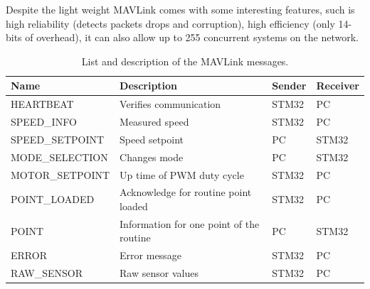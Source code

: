 \documentclass[12pt,a4paper]{article}
\begin{document}
Despite the light weight MAVLink comes with some interesting features, such is high reliability (detects packets drops and corruption), high efficiency (only 14-bits of overhead), it can also allow up to 255 concurrent systems on the network.

\begin{table}[H]
	\centering
	\begin{tabular}{l||p{3cm}|l|l} 
		\textbf{Name} &\textbf{Description} &\textbf{Sender} &\textbf{Receiver}\\ 
		\hline
		\hline 
		HEARTBEAT &Verifies communication& STM32 & PC \\ 
		\hline 
		SPEED\_INFO &Measured speed  & STM32 & PC \\ 
		\hline 
		SPEED\_SETPOINT & Speed setpoint & PC & STM32 \\ 
		\hline 
		MODE\_SELECTION & Changes mode & PC & STM32  \\ 
		\hline 
		MOTOR\_SETPOINT & Up time of PWM duty cycle & STM32 & PC  \\ 
		\hline 
		POINT\_LOADED & Acknowledge for routine point loaded  & STM32 & PC  \\ 
		\hline 
		POINT & Information for one point of the routine  & PC & STM32  \\  
		\hline 
		ERROR & Error message & STM32 & PC  \\
		\hline
		RAW\_SENSOR & Raw sensor values & STM32 & PC \\
	\end{tabular} 
	\caption{List and description of the MAVLink messages.}
	\label{tab:msg}
\end{table}
\end{document}
